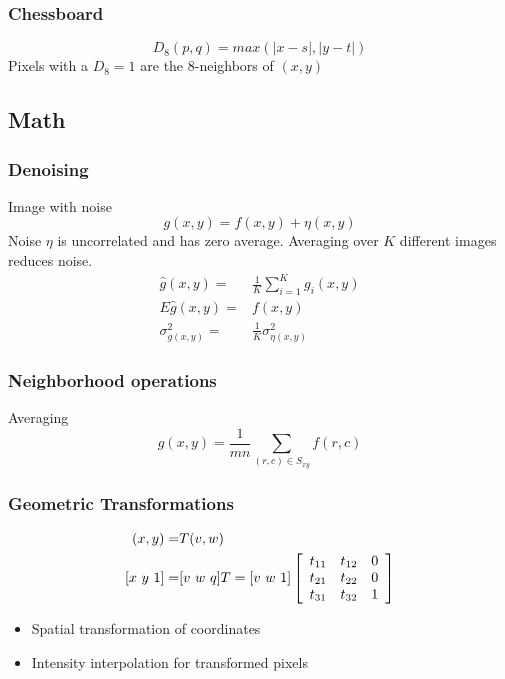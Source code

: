 \subsubsection{Chessboard}
\begin{equation}
D_8(p,q) = max(|x-s|, |y-t|)
\end{equation}
Pixels with a $D_8 = 1$ are the 8-neighbors of $(x,y)$

\subsection{Math}

\subsubsection{Denoising}
Image with noise
\begin{equation}
g(x,y) = f(x,y) + \eta(x,y)
\end{equation}
Noise $\eta$ is uncorrelated and has zero average.  Averaging over $K$ different images reduces noise.
\begin{eqnarray}
\hat{g}(x,y)      =& \frac{1}{K} \sum_{i=1}^{K}g_i(x,y) \\
E{\hat{g}(x,y)}   =& f(x,y) \\
\sigma_{g(x,y)}^2 =& \frac{1}{K} \sigma_{\eta(x,y)}^2
\end{eqnarray}

\subsubsection{Neighborhood operations}
Averaging
\begin{equation}
g(x,y) = \frac{1}{mn} \sum_{(r,c)\in S_{xy}}f(r,c)
\end{equation}

\subsubsection{Geometric Transformations}
\begin{eqnarray}
(x,y) =& T{(v,w)} \notag \\
 \left[ x~y~1 \right] =& [ v~w~q ] T = [ v~w~1 ] 
 \left[ \begin{array}{ccc}
t_{11} & t_{12} & 0 \\
t_{21} & t_{22} & 0 \\
t_{31} & t_{32} & 1 \end{array} \right]
\end{eqnarray}
\begin{itemize}
\item Spatial transformation of coordinates
\item Intensity interpolation for transformed pixels
\end{itemize}
